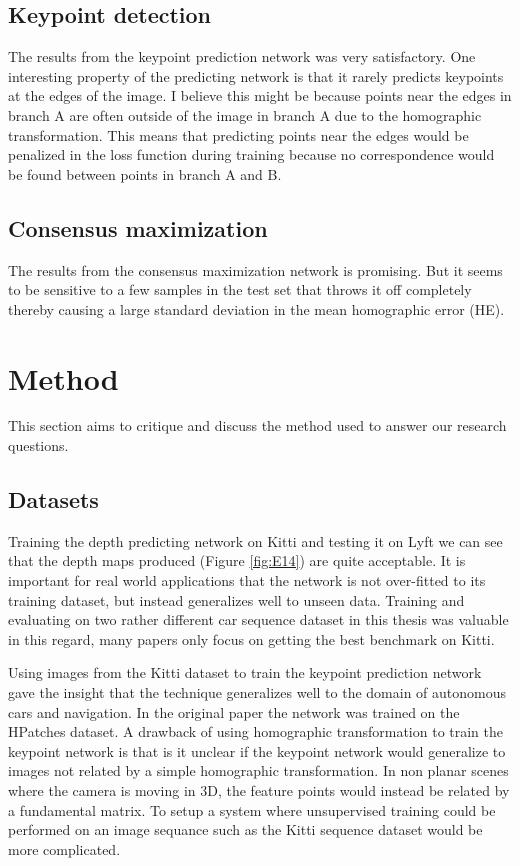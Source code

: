 \subsection{Keypoint detection}

The results from the keypoint prediction network was very satisfactory. One interesting property of the predicting network is that it rarely predicts keypoints at the edges of the image. I believe this might be because points near the edges in branch A are often outside of the image in branch A due to the homographic transformation. This means that predicting points near the edges would be penalized in the loss function during training because no correspondence would be found between points in branch A and B.

\subsection{Consensus maximization}

The results from the consensus maximization network is promising. But it seems to be sensitive to a few samples in the test set that throws it off completely thereby causing a large standard deviation in the mean homographic error (HE).

\section{Method}

This section aims to critique and discuss the method used to answer our research questions.

\subsection{Datasets}

Training the depth predicting network on Kitti and testing it on Lyft we can see that the depth maps produced (Figure \ref{fig:E14}) are quite acceptable. It is important for real world applications that the network is not over-fitted to its training dataset, but instead generalizes well to unseen data. Training and evaluating on two rather different car sequence dataset in this thesis was valuable in this regard, many papers only focus on getting the best benchmark on Kitti.

Using images from the Kitti dataset to train the keypoint prediction network gave the insight that the technique generalizes well to the domain of autonomous cars and navigation. In the original paper the network was trained on the HPatches\cite{hpatches} dataset. A drawback of using homographic transformation to train the keypoint network is that is it unclear if the keypoint network would generalize to images not related by a simple homographic transformation. In non planar scenes where the camera is moving in 3D, the feature points would instead be related by a fundamental matrix. To setup a system where unsupervised training could be performed on an image sequance such as the Kitti sequence dataset would be more complicated\cite{pose-sup}.

